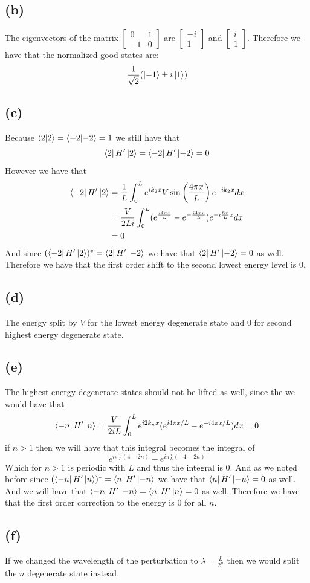\documentclass[11pt]{article}
\begin{document}
\subsection*{(b)}
The eigenvectors of the matrix $\begin{bmatrix}
    0 & 1\\
    -1 & 0
\end{bmatrix}$ are $\begin{bmatrix} -i \\ 1 \end{bmatrix}$ and $\begin{bmatrix} i \\ 1 \end{bmatrix}$.
Therefore we have that the normalized good states are:
$$\frac{1}{\sqrt{2}}(\ket{-1}\pm i\ket{1})$$
\subsection*{(c)}
Because $\bra{2}\ket{2}=\bra{-2}\ket{-2}=1$ we still have that 
$$\bra{2}H'\ket{2}=\bra{-2}H'\ket{-2}=0$$
However we have that
\begin{align*}
    \bra{-2}H'\ket{2}&=\frac{1}{L}\int_{0}^{L}e^{ik_2x}V\sin\left(\frac{4\pi x}{L}\right)e^{-ik_2x}dx\\
    &=\frac{V}{2Li}\int_{0}^{L}(e^{\frac{i4\pi x}{L}}-e^{-\frac{i4\pi x}{L}})e^{-i\frac{8\pi}{L}x}dx\\
    &=0
\end{align*}
And since $(\bra{-2}H'\ket{2})^*=\bra{2}H'\ket{-2}$ we have that $\bra{2}H'\ket{-2}=0$ as well.
Therefore we have that the first order shift to the second lowest 
energy level is $0$.
\subsection*{(d)}
The energy split by $V$ for the lowest energy degenerate state and $0$ for 
second highest energy degenerate state.
\subsection*{(e)}
The highest energy degenerate states should not be lifted as well, since the 
we would have that 
$$\bra{-n}H'\ket{n} = \frac{V}{2iL}\int_{0}^{L}e^{i2k_nx}(e^{i4\pi x/L}-e^{-i4\pi x/L})dx = 0$$
if $n>1$ then we will have that this integral becomes the integral of 
$$e^{i\pi \frac{x}{L}(4-2n)} - e^{i\pi \frac{x}{L}(-4-2n)}$$
Which for $n>1$ is periodic with $L$ and thus the integral is $0$. And as we noted before
since $(\bra{-n}H'\ket{n})^*=\bra{n}H'\ket{-n}$ we have that $\bra{n}H'\ket{-n}=0$ as well. And 
we will have that $\bra{-n}H'\ket{-n}=\bra{n}H'\ket{n}=0$ as well. Therefore we have that the 
first order correction to the energy is $0$ for all $n$.
\subsection*{(f)}
If we changed the wavelength of the perturbation to $\lambda = \frac{L}{2^n}$ then we would split the 
$n$ degenerate state instead.
\end{document}
